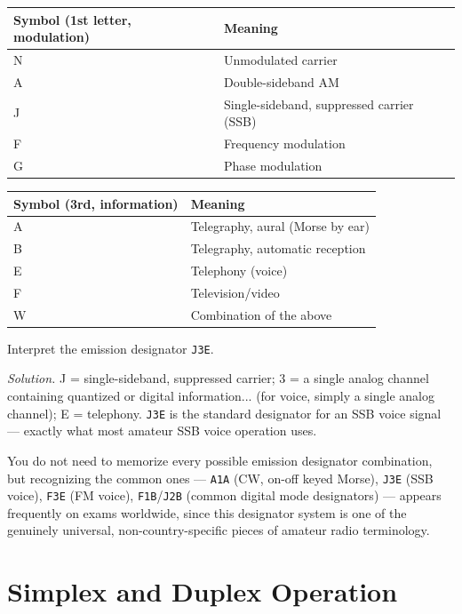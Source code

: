 \begin{center}
\begin{tabular}{@{}ll@{}}
\toprule
Symbol (1st letter, modulation) & Meaning \\
\midrule
N & Unmodulated carrier \\
A & Double-sideband AM \\
J & Single-sideband, suppressed carrier (SSB) \\
F & Frequency modulation \\
G & Phase modulation \\
\bottomrule
\end{tabular}
\quad
\begin{tabular}{@{}ll@{}}
\toprule
Symbol (3rd, information) & Meaning \\
\midrule
A & Telegraphy, aural (Morse by ear) \\
B & Telegraphy, automatic reception \\
E & Telephony (voice) \\
F & Television/video \\
W & Combination of the above \\
\bottomrule
\end{tabular}
\end{center}

\begin{examplebox}
Interpret the emission designator \texttt{J3E}.

\emph{Solution.} J = single-sideband, suppressed carrier; 3 = a single
analog channel containing quantized or digital information... (for
voice, simply a single analog channel); E = telephony. \texttt{J3E} is
the standard designator for an SSB voice signal --- exactly what most
amateur SSB voice operation uses.
\end{examplebox}

\begin{examtip}
You do not need to memorize every possible emission designator
combination, but recognizing the common ones --- \texttt{A1A} (CW,
on-off keyed Morse), \texttt{J3E} (SSB voice), \texttt{F3E} (FM voice),
\texttt{F1B}/\texttt{J2B} (common digital mode designators) --- appears
frequently on exams worldwide, since this designator system is one of
the genuinely universal, non-country-specific pieces of amateur radio
terminology.
\end{examtip}

\section{Simplex and Duplex Operation}

